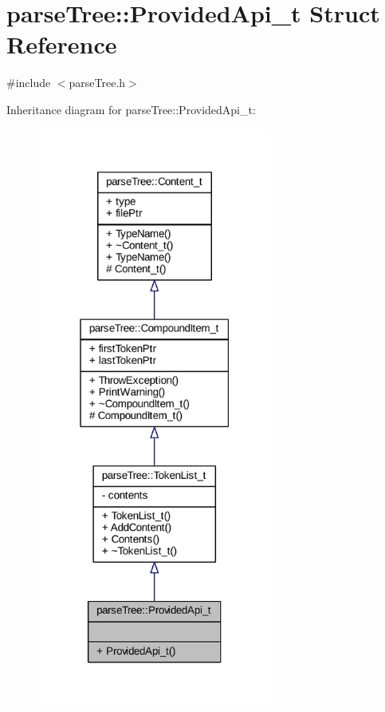 \hypertarget{structparse_tree_1_1_provided_api__t}{}\section{parse\+Tree\+:\+:Provided\+Api\+\_\+t Struct Reference}
\label{structparse_tree_1_1_provided_api__t}


{\ttfamily \#include $<$parse\+Tree.\+h$>$}



Inheritance diagram for parse\+Tree\+:\+:Provided\+Api\+\_\+t\+:
\nopagebreak
\begin{figure}[H]
\begin{center}
\leavevmode
\includegraphics[width=219pt]{structparse_tree_1_1_provided_api__t__inherit__graph}
\end{center}
\end{figure}


